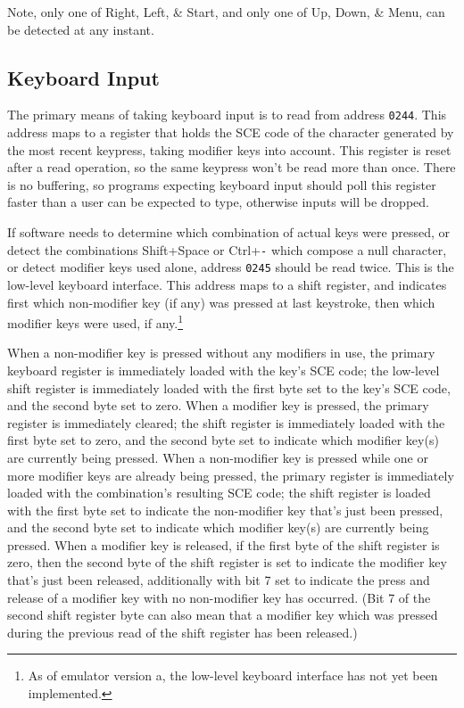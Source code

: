 \documentclass[12pt]{{memoir}}
\begin{document}
Note, only one of \textsf{Right}, \textsf{Left}, \& \textsf{Start}, and only one of \textsf{Up}, \textsf{Down}, \& \textsf{Menu}, can be detected at any instant.

\subsection{Keyboard Input}
\label{ss:keyboard}

The primary means of taking keyboard input is to read from address \texttt{0244}. This address maps to a register that holds the SCE code of the character generated by the most recent keypress, taking modifier keys into account. This register is reset after a read operation, so the same keypress won't be read more than once. There is no buffering, so programs expecting keyboard input should poll this register faster than a user can be expected to type, otherwise inputs will be dropped.

If software needs to determine which combination of actual keys were pressed, or detect the combinations \textsf{Shift+Space} or \textsf{Ctrl+}\texttt{-} which compose a null character, or detect modifier keys used alone, address \texttt{0245} should be read twice. This is the low-level keyboard interface. This address maps to a shift register, and indicates first which non-modifier key (if any) was pressed at last keystroke, then which modifier keys were used, if any.\footnote{As of emulator version a, the low-level keyboard interface has not yet been implemented.}

When a non-modifier key is pressed without any modifiers in use, the primary keyboard register is immediately loaded with the key's SCE code; the low-level shift register is immediately loaded with the first byte set to the key's SCE code, and the second byte set to zero. When a modifier key is pressed, the primary register is immediately cleared; the shift register is immediately loaded with the first byte set to zero, and the second byte set to indicate which modifier key(s) are currently being pressed. When a non-modifier key is pressed while one or more modifier keys are already being pressed, the primary register is immediately loaded with the combination's resulting SCE code; the shift register is loaded with the first byte set to indicate the non-modifier key that's just been pressed, and the second byte set to indicate which modifier key(s) are currently being pressed. When a modifier key is released, if the first byte of the shift register is zero, then the second byte of the shift register is set to indicate the modifier key that's just been released, additionally with bit 7 set to indicate the press and release of a modifier key with no non-modifier key has occurred. (Bit 7 of the second shift register byte can also mean that a modifier key which was pressed during the previous read of the shift register has been released.)
\end{document}
